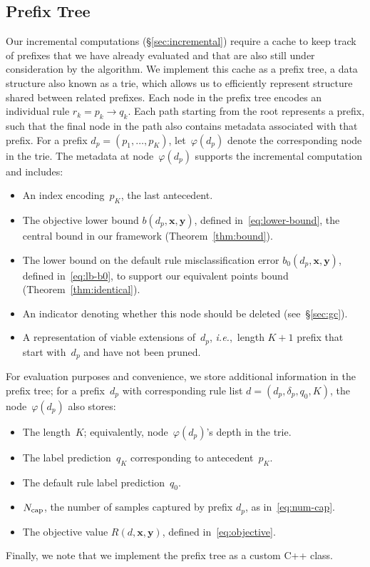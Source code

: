 \documentclass[twoside,11pt]{article}
\def\ie{{\it i.e.},~}
\newcommand{\x}{\mathbf{x}}
\newcommand{\y}{\mathbf{y}}
\def\RL{{d}}
\def\Prefix{d_p}
\def\Labels{\delta_p}
\def\Default{q_0}
\def\Obj{R}
\def\NCap{N_{\textnormal{cap}}}
\begin{document}
\subsection{Prefix Tree}
\label{sec:trie}

Our incremental computations (\S\ref{sec:incremental}) require a
cache to keep track of prefixes that we have already evaluated
and that are also still under consideration by the algorithm.
%
We implement this cache as a prefix tree, a data structure also known as a trie,
which allows us to efficiently represent structure shared between related prefixes.
%
Each node in the prefix tree encodes an individual rule ${r_k = p_k \rightarrow q_k}$.
%
Each path starting from the root represents a prefix, such that the final node
in the path also contains metadata associated with that prefix.
%
For a %
prefix ${\Prefix = (p_1, \dots, p_K)}$,
let~$\varphi(\Prefix)$ denote the corresponding node in the trie.
%
The metadata at node~$\varphi(\Prefix)$ supports the incremental computation
and includes:
\begin{itemize}
\item An index encoding~$p_K$, the last antecedent.
\item The objective lower bound $b(\Prefix, \x, \y)$, defined in~\eqref{eq:lower-bound},
  the central bound in our framework (Theorem~\ref{thm:bound}).
\item The lower bound on the default rule misclassification error
  $b_0(\Prefix, \x, \y)$, defined in~\eqref{eq:lb-b0},
  to support our equivalent points bound (Theorem~\ref{thm:identical}).
\item An indicator denoting whether this node should be deleted (see~\S\ref{sec:gc}).
\item A representation of viable extensions of~$\Prefix$,
  \ie length ${K+1}$ prefix that start with~$\Prefix$ and have not been pruned.
\end{itemize}
For evaluation purposes and convenience, we store additional information in
the prefix tree; for a prefix~$\Prefix$ with corresponding rule list
${\RL = (\Prefix, \Labels, \Default, K)}$, the node~$\varphi(\Prefix)$ also stores:
\begin{itemize}
\item The length~$K$; equivalently, node~$\varphi(\Prefix)$'s depth in the trie. 
\item The label prediction~$q_K$ corresponding to antecedent~$p_K$.
\item The default rule label prediction~$\Default$.
\item $\NCap$, the number of samples captured by prefix $\Prefix$, as in~\eqref{eq:num-cap}.
\item The objective value $\Obj(\RL, \x, \y)$, defined in~\eqref{eq:objective}.
\end{itemize}
%
Finally, we note that we implement the prefix tree as a custom C++ class.
\end{document}
